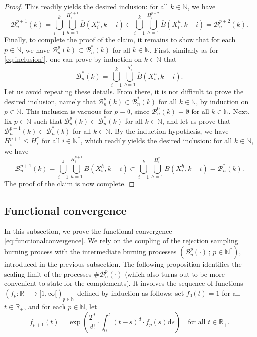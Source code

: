 \documentclass[a4paper,11pt]{article}
\begin{document}
\begin{proof}
This readily yields the desired inclusion: for all $k\in\mathbb{N}$, we have
\[\mathcal{B}_n^{p+1}(k)=\bigcup_{i=1}^k\bigcup_{h=1}^{H_i^{p+1}}\overline{B}\left(X_i^h,k-i\right)\subset\bigcup_{i=1}^k\bigcup_{h=1}^{H_i^{p+2}}\overline{B}\left(X_i^h,k-i\right)=\mathcal{B}_n^{p+2}(k).\]
Finally, to complete the proof of the claim, it remains to show that for each $p\in\mathbb{N}$, we have $\mathcal{B}_n^p(k)\subset\mathcal{B}_n^*(k)$ for all $k\in\mathbb{N}$.
First, similarly as for \eqref{eq:inclusion'}, one can prove by induction on $k\in\mathbb{N}$ that
\[\mathcal{B}_n^*(k)=\bigcup_{i=1}^k\bigcup_{h=1}^{H_i^*}\overline{B}\left(X_i^h,k-i\right).\]
Let us avoid repeating these details.
From there, it is not difficult to prove the desired inclusion, namely that $\mathcal{B}_n^p(k)\subset\mathcal{B}_n^*(k)$ for all $k\in\mathbb{N}$, by induction on $p\in\mathbb{N}$.
This inclusion is vacuous for $p=0$, since $\mathcal{B}_n^0(k)=\emptyset$ for all $k\in\mathbb{N}$.
Next, fix $p\in\mathbb{N}$ such that $\mathcal{B}_n^p(k)\subset\mathcal{B}_n^*(k)$ for all $k\in\mathbb{N}$, and let us prove that $\mathcal{B}_n^{p+1}(k)\subset\mathcal{B}_n^*(k)$ for all $k\in\mathbb{N}$.
By the induction hypothesis, we have $H_i^{p+1}\leq H_i^*$ for all $i\in\mathbb{N}^*$, which readily yields the desired inclusion: for all $k\in\mathbb{N}$, we have
\[\mathcal{B}_n^{p+1}(k)=\bigcup_{i=1}^k\bigcup_{h=1}^{H_i^{p+1}}\overline{B}\left(X_i^h,k-i\right)\subset\bigcup_{i=1}^k\bigcup_{h=1}^{H_i^*}\overline{B}\left(X_i^h,k-i\right)=\mathcal{B}_n^*(k).\]
The proof of the claim is now complete.
\end{proof}

\subsection{Functional convergence}\label{subsec:functionalconvergence}

In this subsection, we prove the functional convergence \eqref{eq:functionalconvergence}.
We rely on the coupling of the rejection sampling burning process with the intermediate burning processes $\left(\mathcal{B}_n^p(\cdot)\,;\,p\in\mathbb{N}^*\right)$, introduced in the previous subsection.
The following proposition identifies the scaling limit of the processes $\#\mathcal{B}_n^p(\cdot)$ (which also turns out to be more convenient to state for the complements).
It involves the sequence of functions $\left(f_p:\mathbb{R}_+\rightarrow{[1,\infty[}\right)_{p\in\mathbb{N}}$ defined by induction as follows: set $f_0(t)=1$ for all $t\in\mathbb{R}_+$, and for each $p\in\mathbb{N}$, let
\[f_{p+1}(t)=\exp\left(\frac{2^d}{d!}\cdot\int_0^t(t-s)^d\cdot f_p(s)\mathrm{d}s\right)\quad\text{for all $t\in\mathbb{R}_+$.}\]
\end{document}
